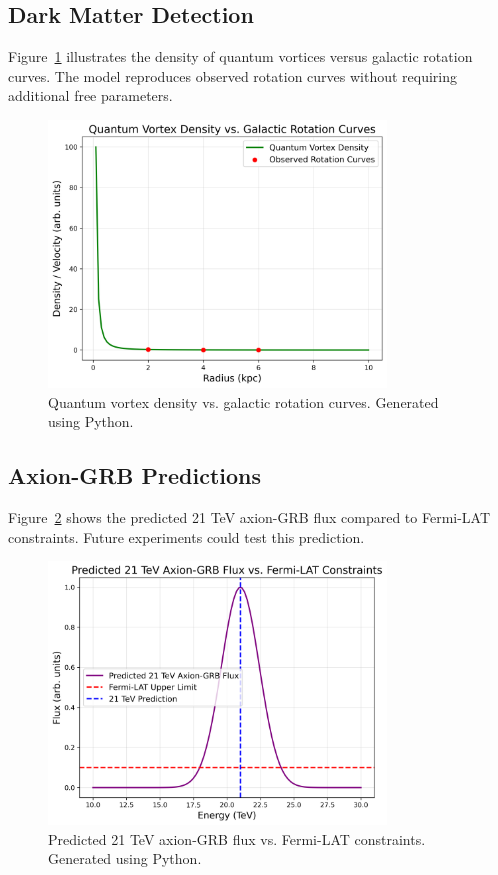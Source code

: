 \documentclass[12pt, a4paper]{article}
\begin{document}
\subsection{Dark Matter Detection}
Figure~\ref{fig:dm_vortices} illustrates the density of quantum vortices versus galactic rotation curves. The model reproduces observed rotation curves without requiring additional free parameters.

\begin{figure}[h]
\centering
\includegraphics[width=0.8\textwidth]{dm_vortices.png}
\caption{Quantum vortex density vs. galactic rotation curves. Generated using Python.}
\label{fig:dm_vortices}
\end{figure}

\subsection{Axion-GRB Predictions}
Figure~\ref{fig:axion_fermi} shows the predicted 21 TeV axion-GRB flux compared to Fermi-LAT constraints. Future experiments could test this prediction.

\begin{figure}[h]
\centering
\includegraphics[width=0.8\textwidth]{axion_fermi.png}
\caption{Predicted 21 TeV axion-GRB flux vs. Fermi-LAT constraints. Generated using Python.}
\label{fig:axion_fermi}
\end{figure}
\end{document}
